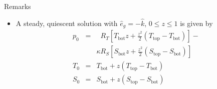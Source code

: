 \documentclass[compress,12pt]{beamer}
\newcommand{\bv}[1]{{\boldsymbol{#1}}}
\begin{document}
\begin{frame}{Remarks}
  \begin{itemize}
    \item A steady, quiescent solution with $\hat{e}_g=-\hat{k}$, $0 \leq z \leq 1$ is given by
      \begin{eqnarray}
	\label{eqn:p-base}\nonumber
	p_0 &=& \phantom{\kappa}R_T\left[T_{\text{bot}}z + \tfrac{z^2}{2}(T_{\text{top}}-T_{\text{bot}})\right]-\\
	\nonumber
	&\phantom{=}& \kappa R_S \left[S_{\text{bot}}z + \tfrac{z^2}{2}(S_{\text{top}}-S_{\text{bot}})\right]\\
	\label{eqn:T-base}\nonumber
	T_0 &=& T_{\text{bot}} + z(T_{\text{top}}-T_{\text{bot}})  \\
	\label{eqn:S-base}\nonumber
	S_0 &=& S_{\text{bot}} + z(S_{\text{top}}-S_{\text{bot}}) 
      \end{eqnarray}

      
  \end{itemize}
  

\end{frame}


\end{document}

